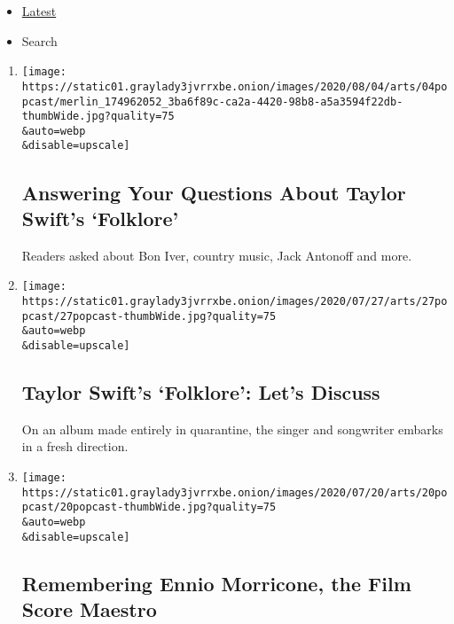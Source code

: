 \begin{itemize}
\tightlist
\item
  \protect\hyperlink{stream-panel}{Latest}
\item
  Search
\end{itemize}

\begin{enumerate}
\def\labelenumi{\arabic{enumi}.}
\item
  \href{/2020/08/04/arts/music/taylor-swift-folklore-questions.html}{}

  \texttt{[image: https://static01.graylady3jvrrxbe.onion/images/2020/08/04/arts/04popcast/merlin\_174962052\_3ba6f89c-ca2a-4420-98b8-a5a3594f22db-thumbWide.jpg?quality=75\\\&auto=webp\\\&disable=upscale]}

  \hypertarget{answering-your-questions-about-taylor-swifts-folklore}{%
  \subsection{Answering Your Questions About Taylor Swift's
  `Folklore'}\label{answering-your-questions-about-taylor-swifts-folklore}}

  Readers asked about Bon Iver, country music, Jack Antonoff and more.
\item
  \href{/2020/07/27/arts/music/popcast-taylor-swift-folklore.html}{}

  \texttt{[image: https://static01.graylady3jvrrxbe.onion/images/2020/07/27/arts/27popcast/27popcast-thumbWide.jpg?quality=75\\\&auto=webp\\\&disable=upscale]}

  \hypertarget{taylor-swifts-folklore-lets-discuss}{%
  \subsection{Taylor Swift's `Folklore': Let's
  Discuss}\label{taylor-swifts-folklore-lets-discuss}}

  On an album made entirely in quarantine, the singer and songwriter
  embarks in a fresh direction.
\item
  \href{/2020/07/20/arts/music/popcast-ennio-morricone.html}{}

  \texttt{[image: https://static01.graylady3jvrrxbe.onion/images/2020/07/20/arts/20popcast/20popcast-thumbWide.jpg?quality=75\\\&auto=webp\\\&disable=upscale]}

  \hypertarget{remembering-ennio-morricone-the-film-score-maestro}{%
  \subsection{Remembering Ennio Morricone, the Film Score
  Maestro}\label{remembering-ennio-morricone-the-film-score-maestro}}


\end{enumerate}
